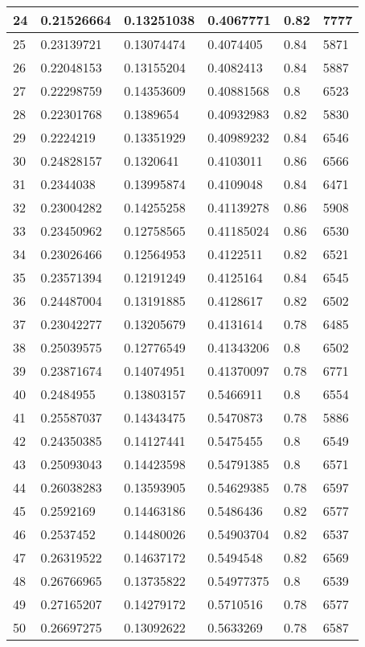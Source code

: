 \begin{longtable}{|l|l|l|l|l|l|}
24 & 0.21526664 & 0.13251038 & 0.4067771 & 0.82 & 7777 \\ \hline 
25 & 0.23139721 & 0.13074474 & 0.4074405 & 0.84 & 5871 \\ \hline 
26 & 0.22048153 & 0.13155204 & 0.4082413 & 0.84 & 5887 \\ \hline 
27 & 0.22298759 & 0.14353609 & 0.40881568 & 0.8 & 6523 \\ \hline 
28 & 0.22301768 & 0.1389654 & 0.40932983 & 0.82 & 5830 \\ \hline 
29 & 0.2224219 & 0.13351929 & 0.40989232 & 0.84 & 6546 \\ \hline 
30 & 0.24828157 & 0.1320641 & 0.4103011 & 0.86 & 6566 \\ \hline 
31 & 0.2344038 & 0.13995874 & 0.4109048 & 0.84 & 6471 \\ \hline 
32 & 0.23004282 & 0.14255258 & 0.41139278 & 0.86 & 5908 \\ \hline 
33 & 0.23450962 & 0.12758565 & 0.41185024 & 0.86 & 6530 \\ \hline 
34 & 0.23026466 & 0.12564953 & 0.4122511 & 0.82 & 6521 \\ \hline 
35 & 0.23571394 & 0.12191249 & 0.4125164 & 0.84 & 6545 \\ \hline 
36 & 0.24487004 & 0.13191885 & 0.4128617 & 0.82 & 6502 \\ \hline 
37 & 0.23042277 & 0.13205679 & 0.4131614 & 0.78 & 6485 \\ \hline 
38 & 0.25039575 & 0.12776549 & 0.41343206 & 0.8 & 6502 \\ \hline 
39 & 0.23871674 & 0.14074951 & 0.41370097 & 0.78 & 6771 \\ \hline 
40 & 0.2484955 & 0.13803157 & 0.5466911 & 0.8 & 6554 \\ \hline 
41 & 0.25587037 & 0.14343475 & 0.5470873 & 0.78 & 5886 \\ \hline 
42 & 0.24350385 & 0.14127441 & 0.5475455 & 0.8 & 6549 \\ \hline 
43 & 0.25093043 & 0.14423598 & 0.54791385 & 0.8 & 6571 \\ \hline 
44 & 0.26038283 & 0.13593905 & 0.54629385 & 0.78 & 6597 \\ \hline 
45 & 0.2592169 & 0.14463186 & 0.5486436 & 0.82 & 6577 \\ \hline 
46 & 0.2537452 & 0.14480026 & 0.54903704 & 0.82 & 6537 \\ \hline 
47 & 0.26319522 & 0.14637172 & 0.5494548 & 0.82 & 6569 \\ \hline 
48 & 0.26766965 & 0.13735822 & 0.54977375 & 0.8 & 6539 \\ \hline 
49 & 0.27165207 & 0.14279172 & 0.5710516 & 0.78 & 6577 \\ \hline 
50 & 0.26697275 & 0.13092622 & 0.5633269 & 0.78 & 6587 \\ \hline 
\end{longtable}